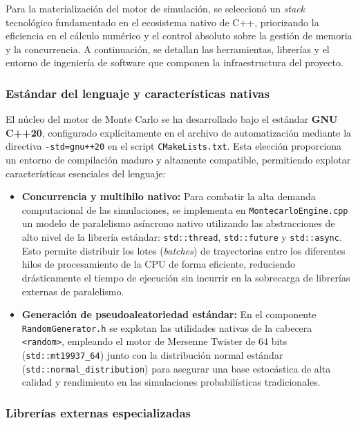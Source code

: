 \documentclass[11pt]{article}
\begin{document}
Para la materialización del motor de simulación, se seleccionó un \textit{stack} tecnológico fundamentado en el ecosistema nativo de C++, priorizando la eficiencia en el cálculo numérico y el control absoluto sobre la gestión de memoria y la concurrencia. A continuación, se detallan las herramientas, librerías y el entorno de ingeniería de software que componen la infraestructura del proyecto.

\subsubsection{Estándar del lenguaje y características nativas}

El núcleo del motor de Monte Carlo se ha desarrollado bajo el estándar \textbf{GNU C++20}, configurado explícitamente en el archivo de automatización mediante la directiva \texttt{-std=gnu++20} en el script \texttt{CMakeLists.txt}. Esta elección proporciona un entorno de compilación maduro y altamente compatible, permitiendo explotar características esenciales del lenguaje:

\begin{itemize}
    \item \textbf{Concurrencia y multihilo nativo:} Para combatir la alta demanda computacional de las simulaciones, se implementa en \texttt{MontecarloEngine.cpp} un modelo de paralelismo asíncrono nativo utilizando las abstracciones de alto nivel de la librería estándar: \texttt{std::thread}, \texttt{std::future} y \texttt{std::async}. Esto permite distribuir los lotes (\textit{batches}) de trayectorias entre los diferentes hilos de procesamiento de la CPU de forma eficiente, reduciendo drásticamente el tiempo de ejecución sin incurrir en la sobrecarga de librerías externas de paralelismo.
    \item \textbf{Generación de pseudoaleatoriedad estándar:} En el componente \texttt{RandomGenerator.h} se explotan las utilidades nativas de la cabecera \texttt{<random>}, empleando el motor de Mersenne Twister de 64 bits (\texttt{std::mt19937\_64}) junto con la distribución normal estándar \\(\texttt{std::normal\_distribution}) para asegurar una base estocástica de alta calidad y rendimiento en las simulaciones probabilísticas tradicionales.
\end{itemize}

\subsubsection{Librerías externas especializadas}
\end{document}
